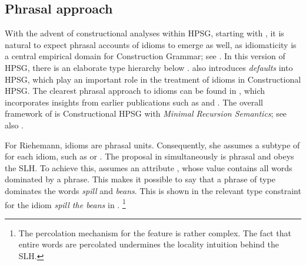 \documentclass[output=paper
 	        ,biblatex
                ,babelshorthands
                ,newtxmath
                ,draftmode
                ,colorlinks, citecolor=brown
]{langscibook}
\begin{document}

\subsection{Phrasal approach}
\label{Sec-Phrasal}

%
With the advent of constructional analyses within HPSG, starting with
\citet{Sag97a}, it is natural to expect phrasal accounts of idioms to emerge as well, as
idiomaticity is a central empirical domain for Construction Grammar\indexcxg; see
.  In this version of HPSG, there is an elaborate type hierarchy below
.  \citet{Sag97a} also introduces \emph{defaults} into HPSG, which play an
important role in the treatment of idioms in Constructional HPSG.  The clearest phrasal approach to
idioms can be found in \citet{Riehemann2001a}, which incorporates insights from earlier publications
such as \citet{Riehemann97a} and \citet{RB99a}.
%
The overall framework of \citet{Riehemann2001a} is Constructional HPSG with \emph{Minimal Recursion Semantics}\indexmrs  \citep{CFMRS95a-u,CFPS2005a}; see also .

\begin{sloppypar}
For Riehemann, idioms are phrasal units.  Consequently, she assumes a subtype of  for each idiom, such as  or .  The proposal in \citet{Riehemann2001a} simultaneously is phrasal and obeys the SLH. To achieve this, \citet{Riehemann2001a} assumes an attribute , whose value contains all words dominated by a phrase. This makes it possible to say that a phrase of type  dominates the words \emph{spill} and \emph{beans}. This is shown in the relevant type constraint for the idiom \emph{spill the beans} in .%
\footnote{The percolation mechanism for the feature  is rather complex. 
The fact that entire words are percolated undermines the locality intuition behind the SLH.
}
\end{sloppypar}
\end{document}
